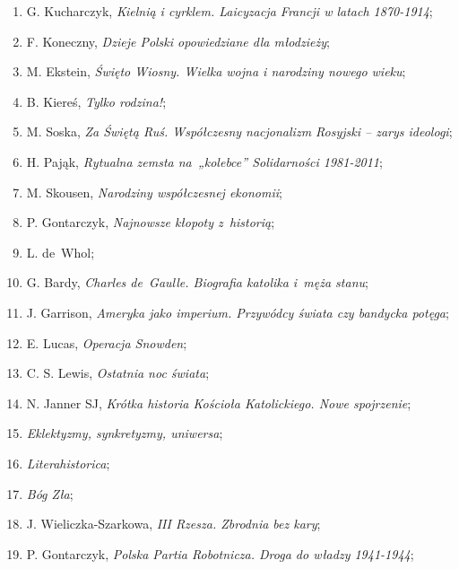 \documentclass[a4paper,11pt]{article}
\begin{document}
\begin{enumerate}
\item G. Kucharczyk, \emph{Kielnią i cyrklem. Laicyzacja Francji w
    latach 1870-1914};

\item F. Koneczny, \emph{Dzieje Polski opowiedziane dla młodzieży};

\item M. Ekstein, \emph{Święto Wiosny. Wielka wojna i narodziny nowego
    wieku};

\item B. Kiereś, \emph{Tylko rodzina!};

\item M. Soska, \emph{Za Świętą Ruś. Współczesny nacjonalizm Rosyjski
    -- zarys ideologi};

\item H. Pająk, \emph{Rytualna zemsta na~„kolebce” Solidarności
    1981-2011};

\item M. Skousen, \emph{Narodziny współczesnej ekonomii};

\item P. Gontarczyk, \emph{Najnowsze kłopoty z~historią};

\item L. de~Whol;

\item G. Bardy, \emph{Charles de~Gaulle. Biografia katolika i~męża
    stanu};

\item J. Garrison, \emph{Ameryka jako imperium. Przywódcy świata czy
    bandycka potęga};

\item E. Lucas, \emph{Operacja Snowden};

\item C. S. Lewis, \emph{Ostatnia noc świata};

\item N. Janner SJ, \emph{Krótka historia Kościoła Katolickiego. Nowe
    spojrzenie};

\item \emph{Eklektyzmy, synkretyzmy, uniwersa};

\item \emph{Literahistorica};

\item \emph{Bóg Zła};

\item J. Wieliczka-Szarkowa, \emph{III Rzesza. Zbrodnia bez kary};

\item P. Gontarczyk, \emph{Polska Partia Robotnicza. Droga do władzy
    1941-1944};


\end{enumerate}
\end{document}
